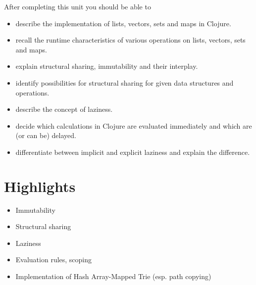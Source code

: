 \documentclass[11pt,a4paper]{article}
\begin{document}
After completing this unit you should be able to

\begin{itemize}
	\item describe the implementation of lists, vectors, sets and maps in Clojure.
    \item recall the runtime characteristics of various operations on lists, vectors, sets and maps.
    \item explain structural sharing, immutability and their interplay.
    \item identify possibilities for structural sharing for given data structures and operations.
    \item describe the concept of laziness.
    \item decide which calculations in Clojure are evaluated immediately and which are (or can be) delayed.
    \item differentiate between implicit and explicit laziness and explain the difference.
\end{itemize}

\section{Highlights}

\begin{itemize}
    \item Immutability
    \item Structural sharing
    \item Laziness
    \item Evaluation rules, scoping
    \item Implementation of Hash Array-Mapped Trie (esp. path copying)
\end{itemize}
\end{document}
